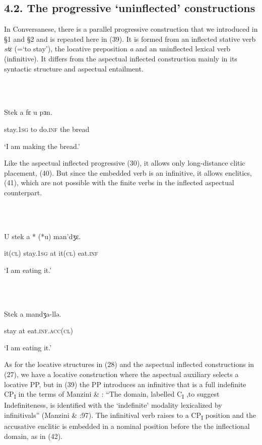 \documentclass[output=paper]{langsci/langscibook}
\begin{document}
\subsection{ 4.2. The progressive ‘uninflected’ constructions}

In Conversanese, there is a parallel progressive construction that we introduced in §1 and §2 and is repeated here in (39). It is formed from an inflected stative verb \textit{stɛ} (=‘to stay’), the locative preposition \textit{a} and an uninflected lexical verb (infinitive). It differs from the aspectual inflected construction mainly in its syntactic structure and aspectual entailment. 

\ea%
    \label{ex:key:39}
    \gll\\
        \\
    \glt
    \z

          Stek     a  fɛ     u  pɜn.      

  stay.\textsc{1sg} to   do.\textsc{inf}  the   bread

‘I am making the bread.’

Like the aspectual inflected progressive (30), it allows only long-distance clitic placement, (40). But since the embedded verb is an infinitive, it allows enclitics, (41), which are not possible with the finite verbs in the inflected aspectual counterpart. 

\ea%
    \label{ex:key:40}
    \gll\\
        \\
    \glt
    \z

          U   stek     a *  (*u)   man’dʒɛ. 

   it\textsc{(cl)}  stay.\textsc{1sg} at   it\textsc{(cl)} eat.\textsc{inf} 

   ‘I am eating it.’ 

\ea%
    \label{ex:key:41}
    \gll\\
        \\
    \glt
    \z

          Stek  a   mandʒa-llə.

  stay  at  eat.\textsc{inf.acc(cl)} 

   ‘I am eating it.’

As for the locative structures in (28) and the aspectual inflected constructions in (27), we have a locative construction where the aspectual auxiliary selects a locative PP, but in (39) the PP introduces an infinitive that is a full indefinite CP\textsubscript{I} in the terms of Manzini \& \citet{Savoia2003}: “The domain, labelled C\textsubscript{I} ,to suggest Indefiniteness, is identified with the ‘indefinite’ modality lexicalized by infinitivals” (Manzini \& \citealt{Savoia2003}:97). The infinitival verb raises to a CP\textsubscript{I} position and the accusative enclitic is embedded in a nominal position before the the inflectional domain, as in (42).
\end{document}
